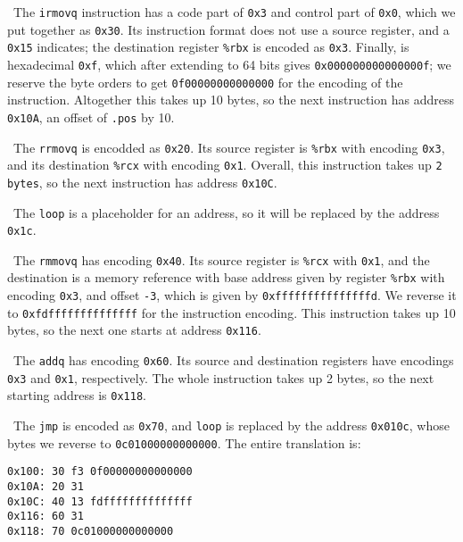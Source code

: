 \documentclass[12pt]{article}
\newenvironment{sol}[1][Solution]{\begin{trivlist}
		\item[\hskip \labelsep {\bfseries #1:}]}{\end{trivlist}}
\begin{document}
\begin{sol}
	\
	The \texttt{irmovq} instruction has a code part of \texttt{0x3}
	and control part of \texttt{0x0}, which we put together as
	\texttt{0x30}. Its instruction format does not use a source register, and
	a \texttt{0x15} indicates; the destination register \texttt{\%rbx} is
	encoded as \texttt{0x3}. Finally, \text{\$15} is hexadecimal \texttt{0xf},
	which after extending to 64 bits gives \texttt{0x000000000000000f};
	we reserve the byte orders to get \texttt{0f00000000000000} for the
	encoding of the instruction. Altogether this  takes up 10 bytes, so
	the next instruction has address \texttt{0x10A}, an offset of \texttt{.pos}
	by 10.
	
	\
	The \texttt{rrmovq} is encodded as \texttt{0x20}. Its source register
	is \texttt{\%rbx} with encoding \texttt{0x3}, and its destination
	\texttt{\%rcx} with encoding \texttt{0x1}. Overall, this instruction
	takes up \texttt{2 bytes}, so the next instruction has address \texttt{0x10C}.
	
	\
	The \texttt{loop} is a placeholder for an address, so it will be
	replaced by the address \texttt{0x1c}.
	
	\
	The \texttt{rmmovq} has encoding \texttt{0x40}. Its source register is 
	\texttt{\%rcx} with \texttt{0x1}, and the destination is a memory
	reference with base address given by register \texttt{\%rbx} with
	encoding \texttt{0x3}, and offset \texttt{-3}, which is given by
	\texttt{0xfffffffffffffffd}. We reverse it to \texttt{0xfdffffffffffffff}
	for the instruction encoding. This instruction takes up 10 bytes, so the
	next one starts at address \texttt{0x116}.
	
	\
	The \texttt{addq} has encoding \texttt{0x60}. Its source and destination
	registers have encodings \texttt{0x3} and \texttt{0x1}, respectively.
	The whole instruction takes up 2 bytes, so the next starting address
	is \texttt{0x118}.
	
	\
	The \texttt{jmp} is encoded as \texttt{0x70}, and \texttt{loop} is
	replaced by the address \texttt{0x010c}, whose bytes we reverse to
	\texttt{0c01000000000000}. The entire translation is:
	\begin{lstlisting}[language={}]
0x100: 30 f3 0f00000000000000
0x10A: 20 31
0x10C: 40 13 fdffffffffffffff
0x116: 60 31
0x118: 70 0c01000000000000
	\end{lstlisting}
\end{sol}
\end{document}
